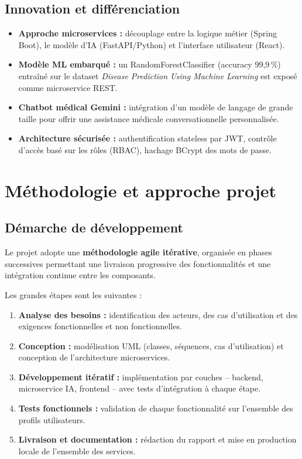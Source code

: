\documentclass[12pt,a4paper]{report}
\begin{document}
\subsection{Innovation et différenciation}

\begin{itemize}
    \item \textbf{Approche microservices :} découplage entre la logique métier
    (Spring Boot), le modèle d'IA (FastAPI/Python) et l'interface utilisateur
    (React).

    \item \textbf{Modèle ML embarqué :} un RandomForestClassifier (accuracy 99,9\,\%)
    entraîné sur le dataset \textit{Disease Prediction Using Machine Learning} est
    exposé comme microservice REST.

    \item \textbf{Chatbot médical Gemini :} intégration d'un modèle de langage de
    grande taille pour offrir une assistance médicale conversationnelle
    personnalisée.

    \item \textbf{Architecture sécurisée :} authentification stateless par JWT,
    contrôle d'accès basé sur les rôles (RBAC), hachage BCrypt des mots de passe.
\end{itemize}

\section{Méthodologie et approche projet}

\subsection{Démarche de développement}

Le projet adopte une \textbf{méthodologie agile itérative}, organisée en phases
successives permettant une livraison progressive des fonctionnalités et une intégration
continue entre les composants.

Les grandes étapes sont les suivantes :
\begin{enumerate}
    \item \textbf{Analyse des besoins :} identification des acteurs, des cas
    d'utilisation et des exigences fonctionnelles et non fonctionnelles.

    \item \textbf{Conception :} modélisation UML (classes, séquences, cas
    d'utilisation) et conception de l'architecture microservices.

    \item \textbf{Développement itératif :} implémentation par couches -- backend,
    microservice IA, frontend -- avec tests d'intégration à chaque étape.

    \item \textbf{Tests fonctionnels :} validation de chaque fonctionnalité sur
    l'ensemble des profils utilisateurs.

    \item \textbf{Livraison et documentation :} rédaction du rapport et mise en
    production locale de l'ensemble des services.
\end{enumerate}
\end{document}
